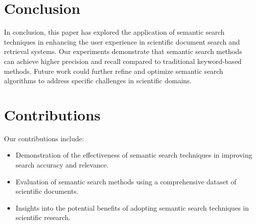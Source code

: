 \documentclass{article}
\begin{document}
\section{Conclusion}
In conclusion, this paper has explored the application of semantic search techniques in enhancing the user experience in scientific document search and retrieval systems. Our experiments demonstrate that semantic search methods can achieve higher precision and recall compared to traditional keyword-based methods. Future work could further refine and optimize semantic search algorithms to address specific challenges in scientific domains.

\section{Contributions}
Our contributions include:
\begin{itemize}
    \item Demonstration of the effectiveness of semantic search techniques in improving search accuracy and relevance.
    \item Evaluation of semantic search methods using a comprehensive dataset of scientific documents.
    \item Insights into the potential benefits of adopting semantic search techniques in scientific research.
\end{itemize}



\end{document}
